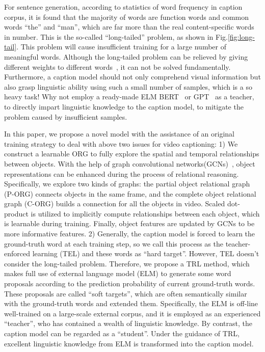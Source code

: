 \documentclass[10pt,twocolumn,letterpaper]{article}
\begin{document}
For sentence generation, according to statistics of word frequency in caption corpus, it is found that the majority of words are function words and common words \eg ``the'' and ``man'', which are far more than the real content-specific words in number. This is the so-called ``long-tailed'' problem, as shown in Fig.\ref{fig:long-tail}. This problem will cause insufficient training for a large number of meaningful words. Although the long-tailed problem can be relieved by giving different weights to different words~\cite{Dong2018}, it can not be solved fundamentally. Furthermore, a caption model should not only comprehend visual information but also grasp linguistic ability using such a small number of samples, which is a so heavy task! Why not employ a ready-made ELM \eg BERT~\cite{Devlin2019} or GPT~\cite{radford2018improving} as a teacher, to directly impart linguistic knowledge to the caption model, to mitigate the problem caused by insufficient samples.


In this paper, we propose a novel model with the assistance of an original training strategy to deal with above two issues for video captioning:
1) We construct a learnable ORG to fully explore the spatial and temporal relationships between objects. With the help of graph convolutional networks(GCNs)~\cite{Kipf2017}, object representations can be enhanced during the process of relational reasoning. Specifically, we explore two kinds of graphs: the partial object relational graph (P-ORG) connects objects in the same frame, and the complete object relational graph (C-ORG) builds a connection for all the objects in video. Scaled dot-product is utilized to implicitly compute relationships between each object, which is learnable during training. Finally, object features are updated by GCNs to be more informative features.
2) Generally, the caption model is forced to learn the ground-truth word at each training step, so we call this process as the teacher-enforced learning (TEL) and these words as “hard target”. However, TEL doesn't consider the long-tailed problem. Therefore, we propose a TRL method, which makes full use of external language model (ELM) to generate some word proposals according to the prediction probability of current ground-truth words. These proposals are called “soft targets”, which are often semantically similar with the ground-truth words and extended them. Specifically, the ELM is off-line well-trained on a large-scale external corpus, and it is employed as an experienced “teacher”, who has contained a wealth of linguistic knowledge. By contrast, the caption model can be regarded as a “student”. Under the guidance of TRL, excellent linguistic knowledge from ELM is transformed into the caption model.
\end{document}
